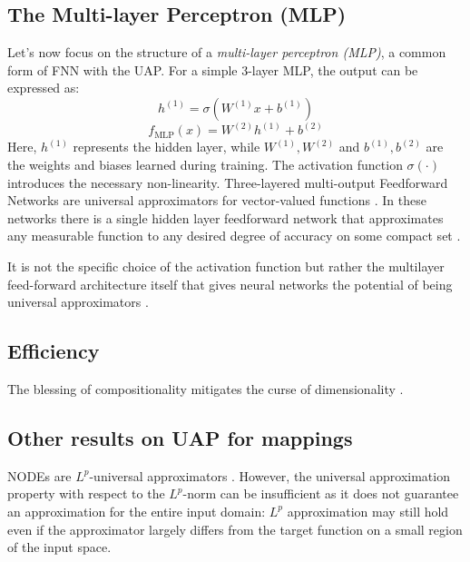 \documentclass{article}
\newcounter{ct}
\begin{document}
\subsection{The Multi-layer Perceptron (MLP)}
Let’s now focus on the structure of a \textit{multi-layer perceptron (MLP)}, a common form of FNN with the UAP.
 For a simple 3-layer MLP, the output can be expressed as:
\[
h^{(1)} = \sigma(W^{(1)} x + b^{(1)})
\]
\[
f_{\text{MLP}}(x) = W^{(2)} h^{(1)} + b^{(2)}
\]
Here, \(h^{(1)}\) represents the hidden layer, while \(W^{(1)}, W^{(2)}\) and \(b^{(1)}, b^{(2)}\) are the weights and biases learned during training. The activation function \(\sigma(\cdot)\) introduces the necessary non-linearity.
Three-layered multi-output Feedforward Networks are universal approximators for vector-valued functions  \citep{irie1988capabilities}.
In these networks there is a single hidden layer feedforward network that approximates any measurable function to any desired degree of accuracy on some compact set  \citep{hornik1989multilayer}.

It is not the specific choice of the activation function but rather the multilayer feed-forward architecture itself that gives neural networks the potential of being universal approximators \citep{hornik1991approximation}.





\subsection{Efficiency}
The blessing of compositionality mitigates the curse of dimensionality  \citep{mhaskar2019function}.


\subsection{Other results on UAP for mappings}

 
NODEs are $L^p$-universal approximators  \citep{li2022deep,li2022deeparxiv}.
However, the universal approximation property with respect to the $L^p$-norm can be insufficient as it does not guarantee an approximation for the entire input domain:
 $L^p$ approximation may still hold even if the approximator largely differs from the target function on a small region of the input space.
\end{document}
